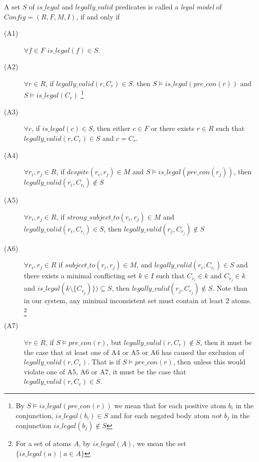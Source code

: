A set $S$ of $is\_legal$ and $legally\_valid$ predicates is called a \textit{legal model} of $Config = (R,F,M,I)$, if and only if
\begin{description}
\item[(A1)]$\forall f \in F$ $is\_legal(f) \in S$.

\item[(A2)] $\forall r \in R$, if $legally\_valid(r,C_{r}) \in S$. then $S\models is\_legal(pre\_con(r))$ and $S\models is\_legal(C_{r})$ \footnote{By $S\models is\_legal(pre\_con(r))$ we mean that for each positive atom $b_{i}$ in the conjunction, $is\_legal(b_{i}) \in S$ and for each negated body atom $not$ $b_{j}$ in the conjunction $is\_legal(b_{j})\notin S$ }

\item[(A3)] $\forall c$, if $is\_legal(c) \in S$, then either $c\in F$ or there exists $r \in R$ such that $legally\_valid(r,C_{r}) \in S$ and $c= C_{r}$.

\item[(A4)] $\forall r_{i}, r_{j} \in R$, if $despite(r_{i}, r_{j}) \in M$ and $S\models is\_legal(pre\_con(r_{j}))$, then $legally\_valid(r_{i},C_{r_{i}}) \notin S$

\item[(A5)] $\forall r_{i}, r_{j} \in R$, if $strong\_subject\_to(r_{i}, r_{j}) \in M$ and $legally\_valid(r_{i},C_{r_{i}}) \in S$, then $legally\_valid(r_{j},C_{r_{j}}) \notin S$


\item[(A6)] $\forall r_{i},r_{j} \in R$ if $subject\_to(r_{i},r_{j}) \in M$, and $legally\_valid(r_{i},C_{r_{i}}) \in S$ and there exists a minimal conflicting set $k \in I$ such that $C_{r_{i}} \in k$ and $C_{r_{j}}\in k$ and $is\_legal(k\setminus \{C_{r_{j}})\})\subseteq S $, then $legally\_valid(r_{j},C_{r_{j}}) \notin S$. Note than in our system, any minimal inconsistent set must contain at least 2 atoms. \footnote{For a set of atoms $A$, by $is\_legal(A)$, we mean the set $\{is\_legal(a)\mid a\in A\}$} 

\item[(A7)] $\forall r\in R$, if $S\models pre\_con(r)$, but $legally\_valid(r,C_{r})\notin S$, then it must be the case that at least one of A4 or A5 or A6 has caused the exclusion of $legally\_valid(r,C_{r})$. That is if $S\models pre\_con(r)$, then unless this would violate one of A5, A6 or A7, it must be the case that $legally\_valid(r,C_{r})\in S$.
\end{description}

